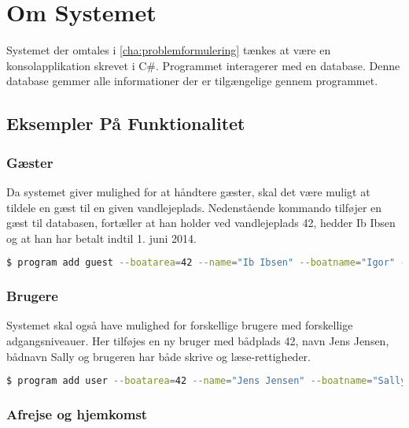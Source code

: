 \section{Om Systemet}
\label{sec:om_systemet}

Systemet der omtales i \cref{cha:problemformulering} tænkes at være en konsolapplikation skrevet i C\#. Programmet interagerer med en database. Denne database gemmer alle informationer der er tilgængelige gennem programmet.

\subsection{Eksempler På Funktionalitet}
\label{sub:eksempler_p_kommandoer}

\subsubsection{Gæster}
\label{ssub:Gaster}


Da systemet giver mulighed for at håndtere gæster, skal det være muligt at tildele en gæst til en given vandlejeplads. Nedenstående kommando tilføjer en gæst til databasen, fortæller at han holder ved vandlejeplads 42, hedder Ib Ibsen og at han har betalt indtil 1. juni 2014.

\begin{lstlisting}[language=bash, label={lst:add_guest}] 
  $ program add guest --boatarea=42 --name="Ib Ibsen" --boatname="Igor" --paiduntil="1/6/2014" 
\end{lstlisting}

\subsubsection{Brugere}
\label{ssub:brugere}

Systemet skal også have mulighed for forskellige brugere med forskellige adgangsniveauer. Her tilføjes en ny bruger med bådplads 42, navn Jens Jensen, bådnavn Sally og brugeren har både skrive og læse-rettigheder.


\begin{lstlisting}[language=bash, label={lst:add_user}] 
  $ program add user --boatarea=42 --name="Jens Jensen" --boatname="Sally" --access="w,r"
\end{lstlisting}


\subsubsection{Afrejse og hjemkomst}
\label{ssub:Afrejse_og_hjemkomst}

